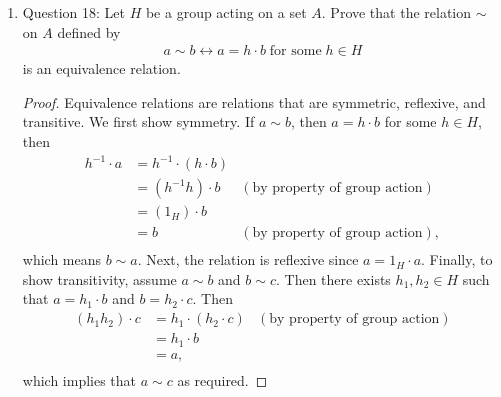 \documentclass{article}
\begin{document}
\begin{enumerate}
\begin{enumerate}
\begin{proof}
          Since isomorphisms preserve order, the image of $x$ under
          conjugation must have the same order as $x$, or in other words,
          $x$ and $gxg^{-1}$ have the same order. \\

          Given any subset $A$ of $G$, $|gAg^{-1}|=|g\cdot(A)|=|A|$, where
          the last equality holds because of the bijectivity of
          conjugation. 
        \end{proof}

      \item Question 18: Let $H$ be a group acting on a set $A$. Prove that
        the relation $\sim$ on $A$ defined by
        \begin{align*}
          a\sim b \leftrightarrow a=h\cdot b\;\text{for some}\;h\in H
        \end{align*}
        is an equivalence relation.

        \begin{proof}
          Equivalence relations are relations that are symmetric,
          reflexive, and transitive. We first show symmetry. If $a\sim b$,
          then $a=h\cdot b$ for some $h\in H$, then
          \begin{align*}
            h^{-1}\cdot a & = h^{-1}\cdot(h\cdot b) & \\
                          & = (h^{-1}h)\cdot b      & (\text{by property of
                          group action}) \\
                          & = (1_H)\cdot b          & \\
                          & = b                     & (\text{by property of
                          group action}), \\
          \end{align*}
          which means $b\sim a$. Next, the relation is reflexive since
          $a=1_H\cdot a$. Finally, to show transitivity, assume $a\sim b$
          and $b\sim c$. Then there exists $h_1,h_2\in H$ such that
          $a=h_1\cdot b$ and $b=h_2\cdot c$. Then
          \begin{align*}
            (h_1h_2)\cdot c & = h_1\cdot(h_2\cdot c)  & (\text{by property of
                            group action}) \\
                            & = h_1\cdot b            & \\
                            & = a,                    & \\
          \end{align*}
          which implies that $a\sim c$ as required.
        \end{proof}


\end{enumerate}
\end{enumerate}
\end{document}
